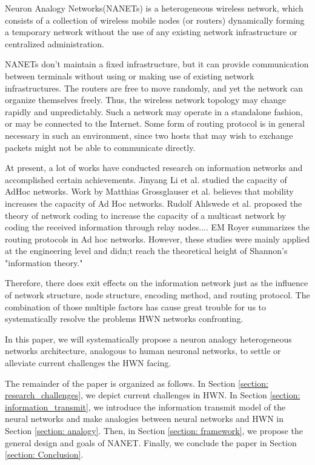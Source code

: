 \documentclass[journal,comsoc]{IEEEtran}
\begin{document}
		Neuron Analogy Networks(NANETs) is a heterogeneous wireless network, which consists of a collection of wireless mobile nodes (or routers) dynamically forming a temporary network without the use of any existing network infrastructure or centralized administration.
		
		NANETs don't maintain a fixed infrastructure, but it can provide communication between terminals without using or making use of existing network infrastructures.
		The routers are free to move randomly, and yet the network can organize themselves freely. 
		Thus, the wireless network topology may change rapidly and unpredictably. 
		Such a network may operate in a standalone fashion, or may be connected to the Internet. 
		Some form of routing protocol is in general necessary in such an environment, 
		since two hosts that may wish to exchange packets might not be able to communicate directly.
		
		At present, a lot of works have conducted research on information networks and accomplished certain achievements.
		Jinyang Li et al. studied the capacity of AdHoc networks.
		Work by Matthias Grossglauser et al. believes that mobility increases the capacity of Ad Hoc networks.
		Rudolf Ahlswede et al. proposed the theory of network coding to increase the capacity of a multicast network by coding the received information through relay nodes....
		EM Royer summarizes the routing protocols in Ad hoc networks.
		However, these studies were mainly applied at the engineering level and didn;t reach the theoretical height of Shannon's "information theory." \par
		
		Therefore, there does exit effects on the information network just as the influence of network structure, node structure, encoding method, and routing protocol.
		The combination of those multiple factors has cause great trouble for us to systematically resolve the problems HWN networks confronting.

		In this paper, we will systematically propose a neuron analogy heterogeneous networks architecture, analogous to human neuronal networks, to settle or alleviate current challenges the HWN facing.
		
		The remainder of the paper is organized as follows. 
		In Section \ref{section: research_challenges}, we depict current challenges in HWN.
		In Section \ref{section: information_transmit}, we introduce the information transmit model of the neural networks 
		and make analogies between neural networks and HWN in Section \ref{section: analogy}.
		Then, in Section \ref{section: framework}, we propose the general design and goals of NANET.
		Finally, we conclude the paper in Section \ref{section: Conclusion}.
		
\end{document}
